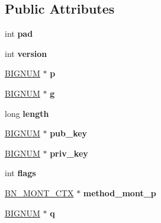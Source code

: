 \subsection*{Public Attributes}
\begin{DoxyCompactItemize}
\item 
\mbox{\label{structdh__st_aae482b7bef6f43b8299ed2bdd1f658c9}} 
int {\bfseries pad}
\item 
\mbox{\label{structdh__st_a661645628bf9785abcb0c7f19946a789}} 
int {\bfseries version}
\item 
\mbox{\label{structdh__st_ad517b332a9e3129370371922b68336b8}} 
\hyperlink{structbignum__st}{B\+I\+G\+N\+UM} $\ast$ {\bfseries p}
\item 
\mbox{\label{structdh__st_aa4bceea00e97aad49a2fd04b0e552f4f}} 
\hyperlink{structbignum__st}{B\+I\+G\+N\+UM} $\ast$ {\bfseries g}
\item 
\mbox{\label{structdh__st_ac1a24166e9a30f03bd66fcd8713e560f}} 
long {\bfseries length}
\item 
\mbox{\label{structdh__st_aad2b90e2aa4a6bea39d10a99bcf88324}} 
\hyperlink{structbignum__st}{B\+I\+G\+N\+UM} $\ast$ {\bfseries pub\+\_\+key}
\item 
\mbox{\label{structdh__st_a3c4e1fb7d7fb23191ec0c4f1229566e2}} 
\hyperlink{structbignum__st}{B\+I\+G\+N\+UM} $\ast$ {\bfseries priv\+\_\+key}
\item 
\mbox{\label{structdh__st_a6edfd86d7930e5a1c3708f822c9b2680}} 
int {\bfseries flags}
\item 
\mbox{\label{structdh__st_a2c49ea291e7d1b359a944e3d807a842f}} 
\hyperlink{structbn__mont__ctx__st}{B\+N\+\_\+\+M\+O\+N\+T\+\_\+\+C\+TX} $\ast$ {\bfseries method\+\_\+mont\+\_\+p}
\item 
\mbox{\label{structdh__st_a6bbb03a3acdbab173e1b4f74bf53d581}} 
\hyperlink{structbignum__st}{B\+I\+G\+N\+UM} $\ast$ {\bfseries q}
\item 
\mbox{\label{structdh__st_af6140cb07291cd40b23442d1466ec114}} 

\end{DoxyCompactItemize}
